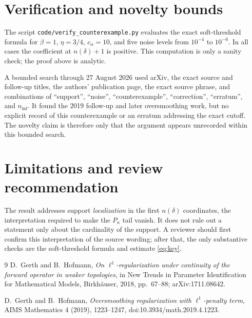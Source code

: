 \documentclass[11pt]{article}
\begin{document}
\section{Verification and novelty bounds}

The script \texttt{code/verify\_counterexample.py} evaluates the exact
soft-threshold formula for $\beta=1$, $\eta=3/4$, $c_\alpha=10$, and five noise
levels from $10^{-4}$ to $10^{-6}$.  In all cases the coefficient at
$n(\delta)+1$ is positive.  This computation is only a sanity check; the proof
above is analytic.

A bounded search through 27 August 2026 used arXiv, the exact source and
follow-up titles, the authors' publication page, the exact source phrase, and
combinations of ``support'', ``noise'', ``counterexample'', ``correction'',
``erratum'', and $n_{\mathrm{inf}}$.  It found the 2019 follow-up and later
oversmoothing work, but no explicit record of this counterexample or an erratum
addressing the exact cutoff.  The novelty claim is therefore only that the
argument appears unrecorded within this bounded search.

\section{Limitations and review recommendation}

The result addresses support \emph{localization} in the first $n(\delta)$
coordinates, the interpretation required to make the $P_n$ tail vanish.  It
does not rule out a statement only about the cardinality of the support.  A
reviewer should first confirm this interpretation of the source wording; after
that, the only substantive checks are the soft-threshold formula and estimate
\eqref{eq:key}.

\begin{thebibliography}{9}
D.~Gerth and B.~Hofmann,
\emph{On $\ell^1$-regularization under continuity of the forward operator in
weaker topologies}, in New Trends in Parameter Identification for Mathematical
Models, Birkh\"auser, 2018, pp.~67--88; arXiv:1711.08642.

D.~Gerth and B.~Hofmann,
\emph{Oversmoothing regularization with $\ell^1$-penalty term},
AIMS Mathematics 4 (2019), 1223--1247,
doi:10.3934/math.2019.4.1223.
\end{thebibliography}
\end{document}
